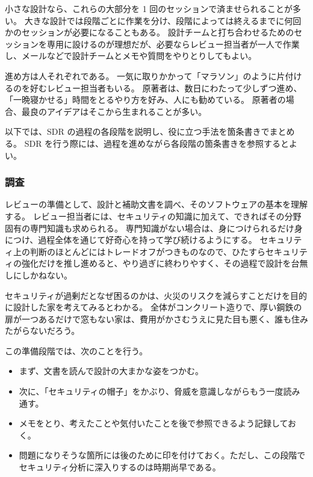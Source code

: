 \documentclass[uplatex]{jsarticle}
\def\label#1{}%
\begin{document}
小さな設計なら、これらの大部分を 1 回のセッションで済ませられることが多い。
大きな設計では段階ごとに作業を分け、段階によっては終えるまでに何回かのセッションが必要になることもある。
設計チームと打ち合わせるためのセッションを専用に設けるのが理想だが、必要ならレビュー担当者が一人で作業し、メールなどで設計チームとメモや質問をやりとりしてもよい。

進め方は人それぞれである。
一気に取りかかって「マラソン」のように片付けるのを好むレビュー担当者もいる。
原著者は、数日にわたって少しずつ進め、「一晩寝かせる」時間をとるやり方を好み、人にも勧めている。
原著者の場合、最良のアイデアはそこから生まれることが多い。

以下では、SDR の過程の各段階を説明し、役に立つ手法を箇条書きでまとめる。
SDR を行う際には、過程を進めながら各段階の箇条書きを参照するとよい。

\subsubsection{調査}

レビューの準備として、設計と補助文書を調べ、そのソフトウェアの基本を理解する。
レビュー担当者には、セキュリティの知識に加えて、できればその分野固有の専門知識も求められる。
専門知識がない場合は、身につけられるだけ身につけ、過程全体を通じて好奇心を持って学び続けるようにする。
セキュリティ上の判断のほとんどにはトレードオフがつきものなので、ひたすらセキュリティの強化だけを推し進めると、やり過ぎに終わりやすく、その過程で設計を台無しにしかねない。

\begin{exa}[火災対策だけを考えた家]\label{exa:ch7-fireproof-house}
セキュリティが過剰だとなぜ困るのかは、火災のリスクを減らすことだけを目的に設計した家を考えてみるとわかる。
全体がコンクリート造りで、厚い鋼鉄の扉が一つあるだけで窓もない家は、費用がかさむうえに見た目も悪く、誰も住みたがらないだろう。
\end{exa}

この準備段階では、次のことを行う。
\begin{itemize}
\item まず、文書を読んで設計の大まかな姿をつかむ。
\item 次に、「セキュリティの帽子」をかぶり、脅威を意識しながらもう一度読み通す。
\item メモをとり、考えたことや気付いたことを後で参照できるよう記録しておく。
\item 問題になりそうな箇所には後のために印を付けておく。ただし、この段階でセキュリティ分析に深入りするのは時期尚早である。
\end{itemize}
\end{document}
